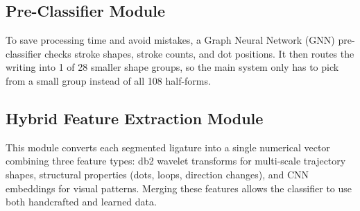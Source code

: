 \documentclass[12pt,a4paper]{report}
\begin{document}
\subsection{Pre-Classifier Module}
To save processing time and avoid mistakes, a Graph Neural Network (GNN) pre-classifier checks stroke shapes, stroke counts, and dot positions. It then routes the writing into 1 of 28 smaller shape groups, so the main system only has to pick from a small group instead of all 108 half-forms.

\subsection{Hybrid Feature Extraction Module}
This module converts each segmented ligature into a single numerical vector combining three feature types: db2 wavelet transforms for multi-scale trajectory shapes, structural properties (dots, loops, direction changes), and CNN embeddings for visual patterns. Merging these features allows the classifier to use both handcrafted and learned data.
\end{document}
